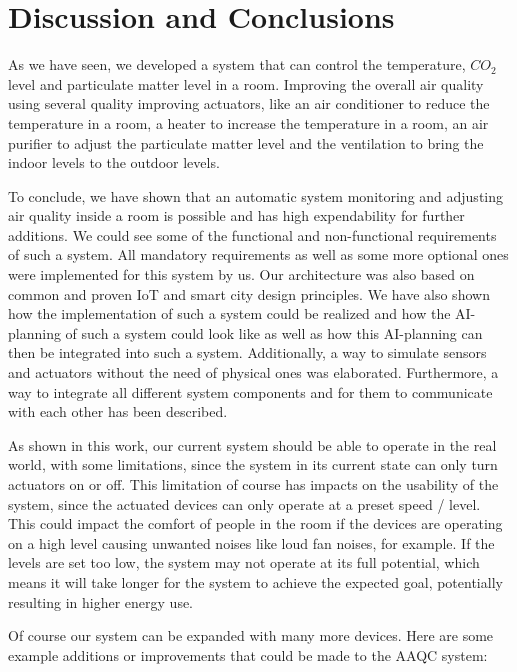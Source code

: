 \section{Discussion and Conclusions}\label{sec:discussion-and-conclusions}

As we have seen, we developed a system that can control the temperature, $CO_2$ level and particulate matter level in a room.
Improving the overall air quality using several quality improving actuators, like an air conditioner to reduce the temperature in a room, a heater to increase the temperature in a room, an air purifier to adjust the particulate matter level and the ventilation to bring the indoor levels to the outdoor levels.

To conclude, we have shown that an automatic system monitoring and adjusting air quality inside a room is possible and has high expendability for further additions.
We could see some of the functional and non-functional requirements of such a system.
All mandatory requirements as well as some more optional ones were implemented for this system by us.
Our architecture was also based on common and proven IoT and smart city design principles.
We have also shown how the implementation of such a system could be realized and how the AI-planning of such a system could look like as well as how this AI-planning can then be integrated into such a system.
Additionally, a way to simulate sensors and actuators without the need of physical ones was elaborated.
Furthermore, a way to integrate all different system components and for them to communicate with each other has been described.

As shown in this work, our current system should be able to operate in the real world, with some limitations, since the system in its current state can only turn actuators on or off.
This limitation of course has impacts on the usability of the system, since the actuated devices can only operate at a preset speed / level.
This could impact the comfort of people in the room if the devices are operating on a high level causing unwanted noises like loud fan noises, for example.
If the levels are set too low, the system may not operate at its full potential, which means it will take longer for the system to achieve the expected goal, potentially resulting in higher energy use.

Of course our system can be expanded with many more devices.
Here are some example additions or improvements that could be made to the AAQC system:

